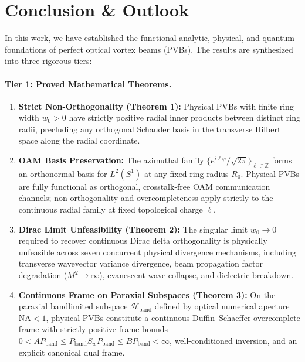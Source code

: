 \documentclass{optica-article}
\begin{document}
\section{Conclusion \& Outlook}
\label{sec:conclusion}

In this work, we have established the functional-analytic, physical, and quantum foundations of perfect optical vortex beams (PVBs). The results are synthesized into three rigorous tiers:

\paragraph{Tier 1: Proved Mathematical Theorems.}
\begin{enumerate}
    \item \textbf{Strict Non-Orthogonality (Theorem 1):} Physical PVBs with finite ring width $w_0 > 0$ have strictly positive radial inner products between distinct ring radii, precluding any orthogonal Schauder basis in the transverse Hilbert space along the radial coordinate.
    \item \textbf{OAM Basis Preservation:} The azimuthal family $\{e^{i\ell\varphi}/\sqrt{2\pi}\}_{\ell \in \mathbb{Z}}$ forms an orthonormal basis for $L^2(S^1)$ at any fixed ring radius $R_0$. Physical PVBs are fully functional as orthogonal, crosstalk-free OAM communication channels; non-orthogonality and overcompleteness apply strictly to the continuous radial family at fixed topological charge $\ell$.
    \item \textbf{Dirac Limit Unfeasibility (Theorem 2):} The singular limit $w_0 \to 0$ required to recover continuous Dirac delta orthogonality is physically unfeasible across seven concurrent physical divergence mechanisms, including transverse wavevector variance divergence, beam propagation factor degradation ($M^2 \to \infty$), evanescent wave collapse, and dielectric breakdown.
    \item \textbf{Continuous Frame on Paraxial Subspaces (Theorem 3):} On the paraxial bandlimited subspace $\mathcal{H}_{\text{band}}$ defined by optical numerical aperture $\text{NA} < 1$, physical PVBs constitute a continuous Duffin--Schaeffer overcomplete frame with strictly positive frame bounds $0 < A P_{\text{band}} \le P_{\text{band}} S_w P_{\text{band}} \le B P_{\text{band}} < \infty$, well-conditioned inversion, and an explicit canonical dual frame.
\end{enumerate}
\end{document}
